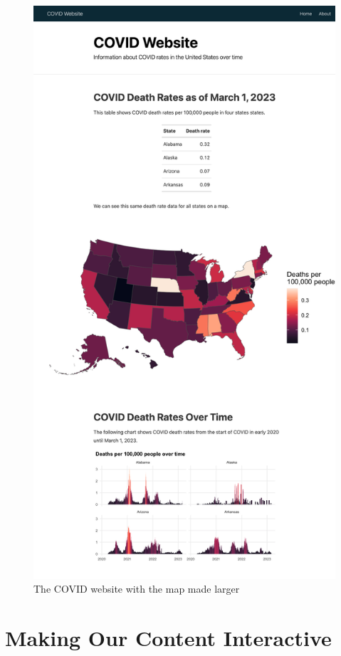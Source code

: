 \documentclass[
]{book}
\begin{document}
\begin{figure}
\includegraphics[width=1\linewidth]{assets/covid-website-static-page-wide-map} \caption{The COVID website with the map made larger}\label{fig:covid-website-static-page-wide-map}
\end{figure}

\hypertarget{making-our-content-interactive}{%
\section*{Making Our Content Interactive}\label{making-our-content-interactive}}
\end{document}
